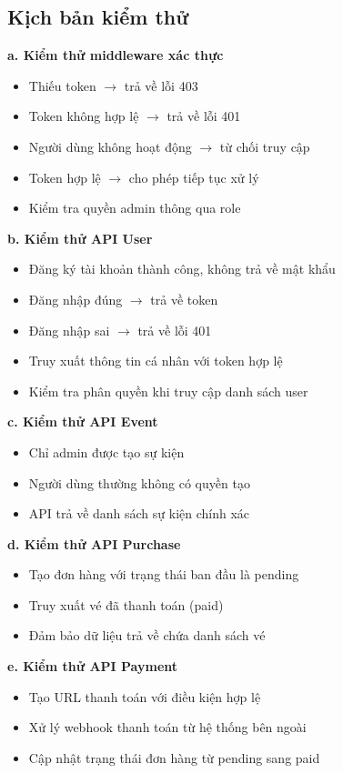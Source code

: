 \subsection{Kịch bản kiểm thử}
\textbf{a. Kiểm thử middleware xác thực}
\begin{itemize}
    \item[-] Thiếu token $\rightarrow$ trả về lỗi 403
    \item[-] Token không hợp lệ $\rightarrow$ trả về lỗi 401
    \item[-] Người dùng không hoạt động $\rightarrow$ từ chối truy cập
    \item[-] Token hợp lệ $\rightarrow$ cho phép tiếp tục xử lý
    \item[-] Kiểm tra quyền admin thông qua role
\end{itemize}
\textbf{b. Kiểm thử API User}
\begin{itemize}
    \item[-] Đăng ký tài khoản thành công, không trả về mật khẩu
    \item[-] Đăng nhập đúng $\rightarrow$ trả về token
    \item[-] Đăng nhập sai $\rightarrow$ trả về lỗi 401
    \item[-] Truy xuất thông tin cá nhân với token hợp lệ
    \item[-] Kiểm tra phân quyền khi truy cập danh sách user
\end{itemize}
\textbf{c. Kiểm thử API Event}
\begin{itemize}
    \item[-] Chỉ admin được tạo sự kiện
    \item[-] Người dùng thường không có quyền tạo
    \item[-] API trả về danh sách sự kiện chính xác
\end{itemize}
\textbf{d. Kiểm thử API Purchase}
\begin{itemize}
    \item[-] Tạo đơn hàng với trạng thái ban đầu là pending
    \item[-] Truy xuất vé đã thanh toán (paid)
    \item[-] Đảm bảo dữ liệu trả về chứa danh sách vé
\end{itemize}
\textbf{e. Kiểm thử API Payment}
\begin{itemize}
    \item[-] Tạo URL thanh toán với điều kiện hợp lệ
    \item[-] Xử lý webhook thanh toán từ hệ thống bên ngoài
    \item[-] Cập nhật trạng thái đơn hàng từ pending sang paid
\end{itemize}

